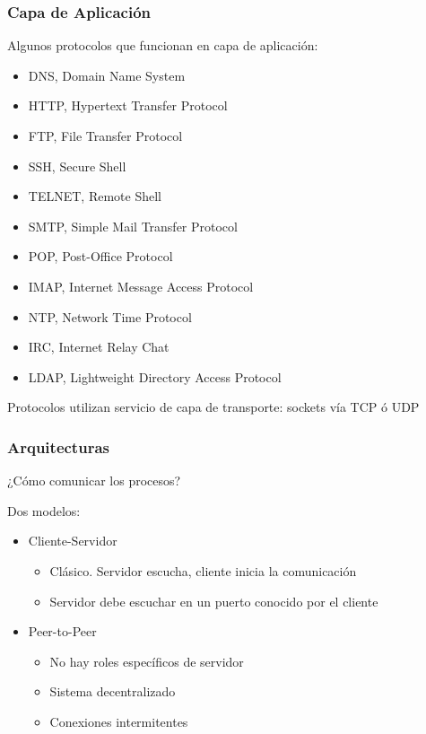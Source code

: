 \documentclass[letter]{beamer}
\begin{document}
\begin{frame}
  \frametitle{Capa de Aplicación}

  Algunos protocolos que funcionan en capa de aplicación:
  \begin{itemize}
    \item DNS, Domain Name System
    \item HTTP, Hypertext Transfer Protocol
    \item FTP, File Transfer Protocol
    \item SSH, Secure Shell
    \item TELNET, Remote Shell
    \item SMTP, Simple Mail Transfer Protocol
    \item POP, Post-Office Protocol
    \item IMAP, Internet Message Access Protocol
    \item NTP, Network Time Protocol
    \item IRC, Internet Relay Chat
    \item LDAP, Lightweight Directory Access Protocol
  \end{itemize}
  Protocolos utilizan servicio de capa de transporte: sockets vía TCP ó UDP
\end{frame}


\begin{frame}
  \frametitle{Arquitecturas}

  ¿Cómo comunicar los procesos?
  
  Dos modelos:
  \begin{itemize}
    \item Cliente-Servidor
      \begin{itemize}
        \item Clásico. Servidor escucha, cliente inicia la comunicación
        \item Servidor debe escuchar en un puerto conocido por el cliente
      \end{itemize}
    \item Peer-to-Peer
      \begin{itemize}
        \item No hay roles específicos de servidor
        \item Sistema decentralizado
        \item Conexiones intermitentes
      \end{itemize}
  \end{itemize}
  

\end{frame}
\end{document}
